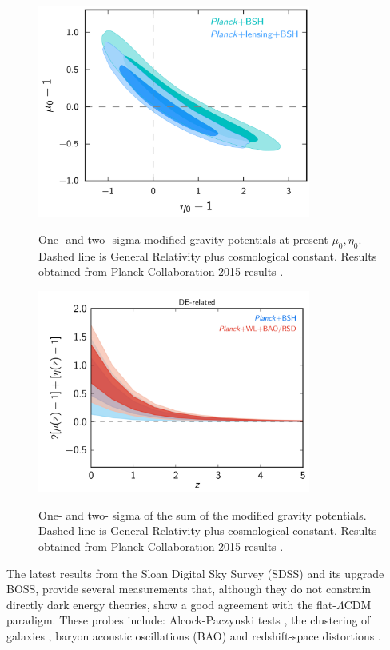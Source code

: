 \begin{figure}
\begin{center}
\includegraphics[width=0.8\textwidth]{./Pictures/mg_planck2015.png}
\caption{One- and two- sigma modified gravity potentials at present $\mu_0,\eta_0$. Dashed line is General Relativity plus cosmological constant. Results obtained from Planck Collaboration 2015 results \cite{2016A&A...594A..14P}.}
\label{fig:mg_planck2015}
\vspace*{0.2cm}
\includegraphics[width=0.8\textwidth]{./Pictures/munu_planck2015.png}
\caption{One- and two- sigma of the sum of the modified gravity potentials. Dashed line is General Relativity plus cosmological constant. Results obtained from Planck Collaboration 2015 results \cite{2016A&A...594A..14P}. }
\label{fig:munu_planck2015}
\end{center}
\end{figure}
The latest results from the Sloan Digital Sky Survey (SDSS) and its upgrade BOSS, provide several measurements that, although they do not constrain directly dark energy theories, show a good agreement with the flat-$\Lambda$CDM paradigm. These probes include: Alcock-Paczynski tests \cite{2016ApJ...832..103L}, the clustering of galaxies \cite{2016arXiv160703155A}, baryon acoustic oscillations (BAO) \cite{2016arXiv160703154W,2017arXiv170200176B} and redshift-space distortions \cite{2017MNRAS.465.1757G}.
\newline

